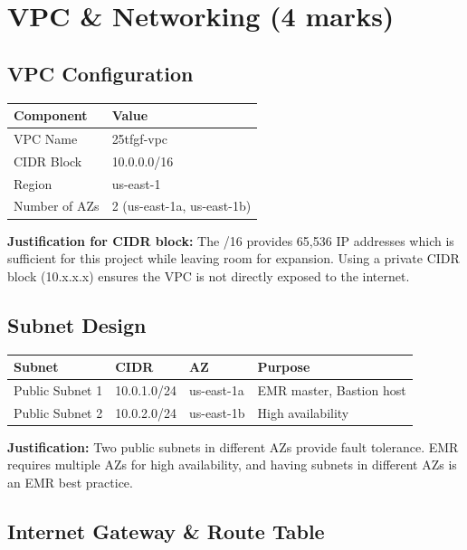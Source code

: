 \documentclass[11pt,a4paper]{article}
\begin{document}
\section{VPC \& Networking (4 marks)}

\subsection{VPC Configuration}

\begin{table}[H]
\centering
\begin{tabular}{@{}ll@{}}
\toprule
\textbf{Component} & \textbf{Value} \\
\midrule
VPC Name & 25tfgf-vpc \\
CIDR Block & 10.0.0.0/16 \\
Region & us-east-1 \\
Number of AZs & 2 (us-east-1a, us-east-1b) \\
\bottomrule
\end{tabular}
\end{table}

\textbf{Justification for CIDR block:} The /16 provides 65,536 IP addresses which is sufficient for this project while leaving room for expansion. Using a private CIDR block (10.x.x.x) ensures the VPC is not directly exposed to the internet.

\subsection{Subnet Design}

\begin{table}[H]
\centering
\begin{tabular}{@{}llll@{}}
\toprule
\textbf{Subnet} & \textbf{CIDR} & \textbf{AZ} & \textbf{Purpose} \\
\midrule
Public Subnet 1 & 10.0.1.0/24 & us-east-1a & EMR master, Bastion host \\
Public Subnet 2 & 10.0.2.0/24 & us-east-1b & High availability \\
\bottomrule
\end{tabular}
\end{table}

\textbf{Justification:} Two public subnets in different AZs provide fault tolerance. EMR requires multiple AZs for high availability, and having subnets in different AZs is an EMR best practice.

\subsection{Internet Gateway \& Route Table}
\end{document}
